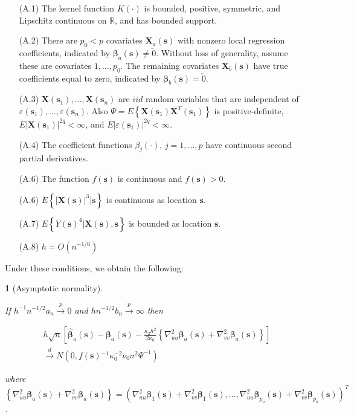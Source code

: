\documentclass[12pt,english,authoryear, review]{article}\usepackage[]{graphicx}\usepackage[]{color}
\theoremstyle{plain}
\newtheorem{thm}{\protect\theoremname}
\theoremstyle{plain}
\providecommand{\theoremname}{Theorem}
\begin{document}
\begin{itemize}
\item[(A.1)] The kernel function $K\left(\cdot\right)$ is bounded, positive,
symmetric, and Lipschitz continuous on $\mathbb{R}$, and has bounded
support.
\item[(A.2)] There are $p_{0}<p$ covariates $\bm{X}_{a}\left(\bm{s}\right)$
with nonzero local regression coefficients, indicated by $\bm{\beta}_{a}(\bm{s})\ne\utilde{0}$.
Without loss of generality, assume these are covariates $1,\dots,p_{0}$.
The remaining covariates $\bm{X}_{b}\left(\bm{s}\right)$ have true
coefficients equal to zero, indicated by $\bm{\beta}_{b}\left(\bm{s}\right)=\utilde{0}$.
\item[(A.3)] $\bm{X}\left(\bm{s}_{1}\right),\dots,\bm{X}\left(\bm{s}_{n}\right)$
are $iid$ random variables that are independent of $\varepsilon\left(\bm{s}_{1}\right),\dots,\varepsilon\left(\bm{s}_{n}\right)$.
Also $\Psi=E\left\{ \bm{X}\left(\bm{s}_{1}\right)\bm{X}^{T}\left(\bm{s}_{1}\right)\right\} $
is positive-definite, $E\left|\bm{X}\left(\bm{s}_{1}\right)\right|^{2q}<\infty$,
and $E\left|\varepsilon\left(\bm{s}_{1}\right)\right|^{2q}<\infty$.
\item[(A.4)] The coefficient functions $ $$\beta_{j}\left(\cdot\right)$, $j=1,\dots,p$
have continuous second partial derivatives.
\item[(A.6)] The function $f\left(\bm{s}\right)$ is continuous and $f\left(\bm{s}\right)>0$.
\item[(A.6)] $E\left\{ \left|\bm{X}\left(\bm{s}\right)\right|^{3}|\bm{s}\right\} $
is continuous as location $\bm{s}$.
\item[(A.7)] $E\left\{ Y\left(\bm{s}\right)^{4}|\bm{X}\left(\bm{s}\right),\bm{s}\right\} $
is bounded as location $\bm{s}$.
\item[(A.8)] $h=O\left(n^{-1/6}\right)$
\end{itemize}
Under these conditions, we obtain the following:
\begin{thm}[Asymptotic normality]
\label{theorem:normality} 



If $h^{-1}n^{-1/2}a_{n}\xrightarrow{p}0$ and $hn^{-1/2}b_{n}\xrightarrow{p}\infty$
then

\begin{multline*}
h\sqrt{n}\left[\hat{\bm{\beta}}_{a}\left(\bm{s}\right)-\bm{\beta}_{a}\left(\bm{s}\right)-\frac{\kappa_{2}h^{2}}{2\kappa_{0}}\left\{ \nabla_{uu}^{2}\bm{\beta}_{a}\left(\bm{s}\right)+\nabla_{vv}^{2}\bm{\beta}_{a}\left(\bm{s}\right)\right\} \right]\\
\xrightarrow{d}N\left(0,f\left(\bm{s}\right){}^{-1}\kappa_{0}^{-2}\nu_{0}\sigma^{2}\Psi^{-1}\right)
\end{multline*}


where $\left\{ \nabla_{uu}^{2}\bm{\beta}_{a}\left(\bm{s}\right)+\nabla_{vv}^{2}\bm{\beta}_{a}\left(\bm{s}\right)\right\} =\left(\nabla_{uu}^{2}\bm{\beta}_{1}\left(\bm{s}\right)+\nabla_{vv}^{2}\bm{\beta}_{1}\left(\bm{s}\right),\dots,\nabla_{uu}^{2}\bm{\beta}_{p_{o}}\left(\bm{s}\right)+\nabla_{vv}^{2}\bm{\beta}_{p_{o}}\left(\bm{s}\right)\right)^{T}$.
\end{thm}
\end{document}
